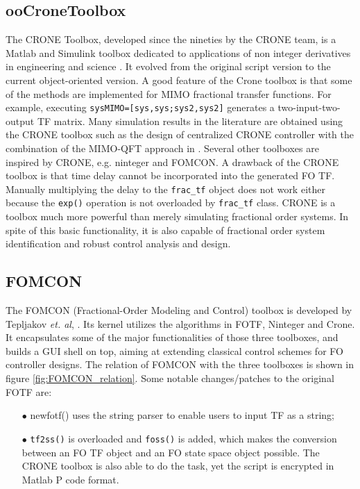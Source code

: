 \documentclass[11pt]{tCON2e}
\theoremstyle{plain}\newtheorem{theorem}{Theorem}
\theoremstyle{definition}
\theoremstyle{remark}
\begin{document}
\subsection{ooCroneToolbox}
The CRONE Toolbox, developed since the nineties by the CRONE team, is a Matlab and Simulink toolbox dedicated to applications of non integer derivatives in engineering and science \cite{ref:CRONE1}. It evolved from the original script version to the current object-oriented version. A good feature of the Crone toolbox is that some of the methods are implemented for MIMO fractional transfer functions. For example, executing {\tt sysMIMO=[sys,sys;sys2,sys2]} generates a two-input-two-output TF matrix. Many simulation results in the literature are obtained using the CRONE toolbox such as the design of centralized CRONE controller with the combination of the MIMO-QFT approach in \cite{ref:Oustaloup_MIMO}. Several other toolboxes are inspired by CRONE, e.g. ninteger and FOMCON.
A drawback of the CRONE toolbox is that time delay cannot be incorporated into the generated FO TF. Manually multiplying the delay to the {\tt frac\_tf} object does not work either because the {\tt exp()} operation is not overloaded by {\tt frac\_tf} class. CRONE is a toolbox much more powerful than merely simulating fractional order systems. In spite of this basic functionality, it is also capable of fractional order system identification and robust control analysis and design.




\subsection{FOMCON}
The FOMCON (Fractional-Order Modeling and Control) toolbox is developed by Tepljakov \emph{et. al}, \cite{ref:FOMCON}. Its kernel utilizes the algorithms in FOTF, Ninteger and Crone. It encapsulates some of the major functionalities of those three toolboxes, and builds a GUI shell on top, aiming at extending classical control schemes for FO controller designs. The relation of FOMCON with the three toolboxes is shown in figure \ref{fig:FOMCON_relation}. Some notable changes/patches to the original FOTF are:
\vspace{-0.1cm}
\begin{itemize}
    \item[\tiny$\bullet$] {\ttfamily newfotf()} uses the string parser to enable users to input TF as a string;
\item[\tiny$\bullet$] {\tt tf2ss()} is overloaded and {\tt foss()} is added, which makes the conversion between an FO TF object and an FO state space object possible. The CRONE toolbox is also able to do the task, yet the script is encrypted in Matlab P code format.
\end{itemize}
\end{document}
